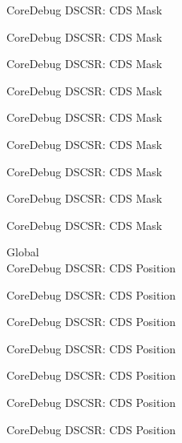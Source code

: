 \begin{DoxyRefList}
\label{deprecated__deprecated000647}%
%
Core\+Debug DSCSR\+: CDS Mask 

\label{deprecated__deprecated000772}%
%
Core\+Debug DSCSR\+: CDS Mask 

\label{deprecated__deprecated000826}%
%
Core\+Debug DSCSR\+: CDS Mask 

\label{deprecated__deprecated000902}%
%
Core\+Debug DSCSR\+: CDS Mask 

\label{deprecated__deprecated000965}%
%
Core\+Debug DSCSR\+: CDS Mask 

\label{deprecated__deprecated001044}%
%
Core\+Debug DSCSR\+: CDS Mask 

\label{deprecated__deprecated001120}%
%
Core\+Debug DSCSR\+: CDS Mask 

\label{deprecated__deprecated001223}%
%
Core\+Debug DSCSR\+: CDS Mask 

\label{deprecated__deprecated001325}%
%
Core\+Debug DSCSR\+: CDS Mask  
\item[Global \doxylink{group___c_m_s_i_s___s_c_b_ga4be5d0f8af5d7d8ec04bde78ce18e10e}{Core\+Debug\+\_\+\+DSCSR\+\_\+\+CDS\+\_\+\+Pos} ]\hfill \\
\label{deprecated__deprecated000093}%
%
Core\+Debug DSCSR\+: CDS Position 

\label{deprecated__deprecated000147}%
%
Core\+Debug DSCSR\+: CDS Position 

\label{deprecated__deprecated000223}%
%
Core\+Debug DSCSR\+: CDS Position 

\label{deprecated__deprecated000286}%
%
Core\+Debug DSCSR\+: CDS Position 

\label{deprecated__deprecated000365}%
%
Core\+Debug DSCSR\+: CDS Position 

\label{deprecated__deprecated000441}%
%
Core\+Debug DSCSR\+: CDS Position 

\label{deprecated__deprecated000544}%
%
Core\+Debug DSCSR\+: CDS Position 


\end{DoxyRefList}
